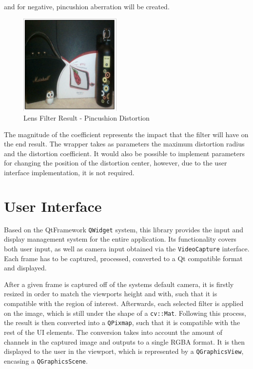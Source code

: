 and for negative, pincushion aberration will be created.

\begin{figure}[H]
	\includegraphics[width=0.45\textwidth, height=0.45\textwidth]{resources/Lens_4.png}
	\caption{Lens Filter Result - Pincushion Distortion}
\end{figure}

The magnitude of the coefficient represents the impact that the filter
will have on the end result. The wrapper takes as parameters the maximum distortion radius and the distortion
coefficient. It would also be possible to implement parameters for changing the position of the distortion
center, however, due to the user interface implementation, it is not required.

\section{User Interface}

Based on the QtFramework \verb|QWidget| system, this library provides the input and display management system
for the entire application. Its functionality covers both user input, as well as camera input obtained via
the \verb|VideoCapture| interface. Each frame has to be captured, processed, converted to a Qt compatible
format and displayed.

After a given frame is captured off of the systems default camera, it is firstly resized in order to match the
viewports height and with, such that it is compatible with the region of interest. Afterwards, each selected
filter is applied on the image, which is still under the shape of a \verb|cv::Mat|. Following this process,
the result is then converted into a \verb|QPixmap|, such that it is compatible with the rest of the UI
elements. The conversion takes into account the amount of channels in the captured image and outputs to a
single RGBA format. It is then displayed to the user in the viewport, which is represented by a
\verb|QGraphicsView|, encasing a \verb|QGraphicsScene|. \cite{qtConvert, qtDoc}

